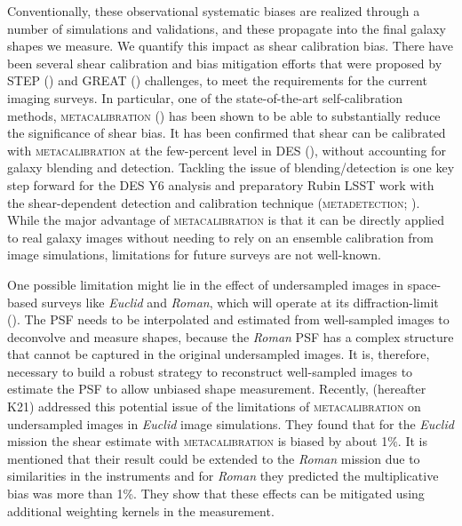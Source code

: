 \documentclass[fleqn,usenatbib]{mnras}
\begin{document}
Conventionally, these observational systematic biases are realized through a number of simulations and validations, and these propagate into the final galaxy shapes we measure. We quantify this impact as shear calibration bias. There have been several shear calibration and bias mitigation efforts that were proposed by STEP (\citealt{2006MNRAS.368.1323H, 2007MNRAS.376...13M}) and GREAT (\citealt{2010MNRAS.405.2044B, 2013ApJS..205...12K, 2015MNRAS.450.2963M}) challenges, to meet the requirements for the current imaging surveys. In particular, one of the state-of-the-art self-calibration methods, \textsc{metacalibration} (\citealt{2017arXiv170202600H, 2017ApJ...841...24S}) has been shown to be able to substantially reduce the significance of shear bias. It has been confirmed that shear can be calibrated with \textsc{metacalibration} at the few-percent level in DES (\citealt{2018MNRAS.481.1149Z, 2020arXiv201103408G}), without accounting for galaxy blending and detection. Tackling the issue of blending/detection is one key step forward for the DES Y6 analysis and preparatory Rubin LSST work with the shear-dependent detection and calibration technique (\textsc{metadetection}; \citealt{2020ApJ...902..138S}). While the major advantage of \textsc{metacalibration} is that it can be directly applied to real galaxy images without needing to rely on an ensemble calibration from image simulations, limitations for future surveys are not well-known. 

One possible limitation might lie in the effect of undersampled images in space-based surveys like \emph{Euclid} and \emph{Roman}, which will operate at its diffraction-limit (\citealt{2013PASP..125.1496S}). The PSF needs to be interpolated and estimated from well-sampled images to deconvolve and measure shapes, because the \emph{Roman} PSF has a complex structure that cannot be captured in the original undersampled images. It is, therefore, necessary to build a robust strategy to reconstruct well-sampled images to estimate the PSF to allow unbiased shape measurement.
Recently, \cite{2021MNRAS.502.4048K} (hereafter K21) addressed this potential issue of the limitations of \textsc{metacalibration} on undersampled images in \emph{Euclid} image simulations. They found that for the \emph{Euclid} mission the shear estimate with \textsc{metacalibration} is biased by about 1$\%$. It is mentioned that their result could be extended to the \emph{Roman} mission due to similarities in the instruments and for \emph{Roman} they predicted the multiplicative bias was more than 1\%. They show that these effects can be mitigated using additional weighting kernels in the measurement. 
\end{document}
